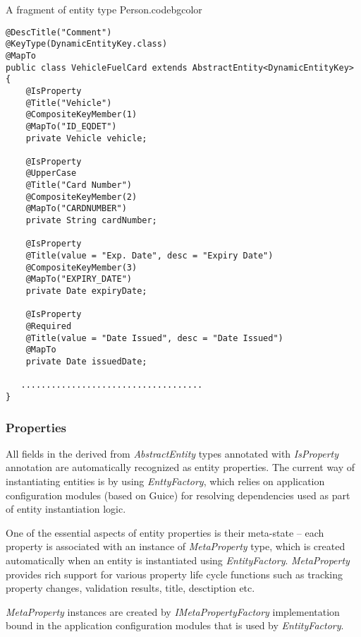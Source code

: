   \begin{code}{A fragment of entity type Person.}{\label{lst:Person}}{codebgcolor}
    \begin{lstlisting}
@DescTitle("Comment")
@KeyType(DynamicEntityKey.class)
@MapTo
public class VehicleFuelCard extends AbstractEntity<DynamicEntityKey> {
    @IsProperty
    @Title("Vehicle")
    @CompositeKeyMember(1)
    @MapTo("ID_EQDET")
    private Vehicle vehicle;

    @IsProperty
    @UpperCase
    @Title("Card Number")
    @CompositeKeyMember(2)
    @MapTo("CARDNUMBER")
    private String cardNumber;

    @IsProperty
    @Title(value = "Exp. Date", desc = "Expiry Date")
    @CompositeKeyMember(3)
    @MapTo("EXPIRY_DATE")
    private Date expiryDate;

    @IsProperty
    @Required
    @Title(value = "Date Issued", desc = "Date Issued")
    @MapTo
    private Date issuedDate;

   ....................................
}
    \end{lstlisting}
  \end{code}


\subsubsection{Properties}

  All fields in the derived from \emph{AbstractEntity} types annotated with \emph{IsProperty} annotation are automatically recognized as entity properties. The current way of instantiating entities is by using \emph{EnttyFactory}, which relies on application configuration modules (based on Guice) for resolving dependencies used as part of entity instantiation logic.

  One of the essential aspects of entity properties is their meta-state -- each property is associated with an instance of \emph{MetaProperty} type, which is created automatically when an entity is instantiated using \emph{EntityFactory}. 
  \emph{MetaProperty} provides rich support for various property life cycle functions such as tracking property changes, validation results, title, desctiption etc.

  \emph{MetaProperty} instances are created by \emph{IMetaPropertyFactory} implementation bound in the application configuration modules that is used by \emph{EntityFactory}.

